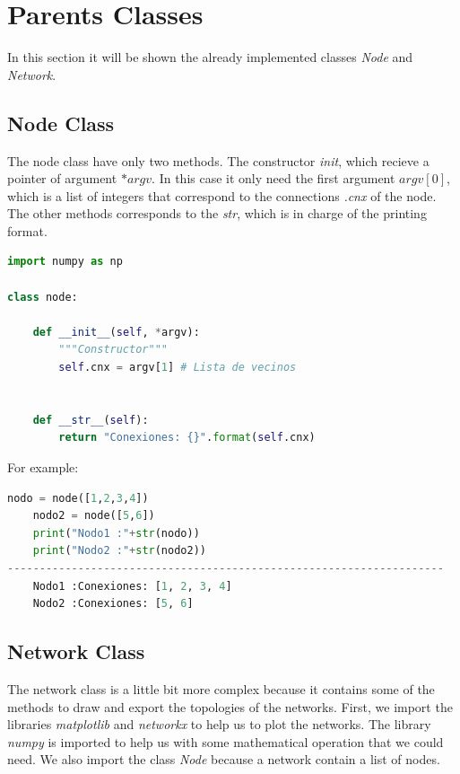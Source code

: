 \documentclass{article}
\begin{document}
\section{Parents Classes}

In this section it will be shown the already implemented classes \textit{Node} and \textit{Network}. 

\subsection{Node Class}

The node class have only two methods. The constructor \textit{init}, which recieve a pointer of argument $*argv$. In this case it only need the first argument $argv[0]$, which is a list of integers that correspond to the connections \textit{.cnx} of the node. The other methods corresponds to the \textit{str}, which is in charge of the printing format. 

\begin{lstlisting}[language=Python, caption=Node Class]
import numpy as np 

class node:

    def __init__(self, *argv):
        """Constructor"""
        self.cnx = argv[1] # Lista de vecinos
        

    def __str__(self):
        return "Conexiones: {}".format(self.cnx)
\end{lstlisting}

For example: 

\begin{lstlisting}[language=Python, caption=Example Node Class]
    nodo = node([1,2,3,4])
    nodo2 = node([5,6])
    print("Nodo1 :"+str(nodo))
    print("Nodo2 :"+str(nodo2))
--------------------------------------------------------------------
    Nodo1 :Conexiones: [1, 2, 3, 4]
    Nodo2 :Conexiones: [5, 6]
\end{lstlisting}

\subsection{Network Class}

The network class is a little bit more complex because it contains some of the methods to draw and export the topologies of the networks. First, we import the libraries \textit{matplotlib}  and \textit{networkx} to help us to plot the networks. The library \textit{numpy} is imported to help us with some mathematical operation that we could need. We also import the class \textit{Node} because a network contain a list of nodes.
\end{document}
